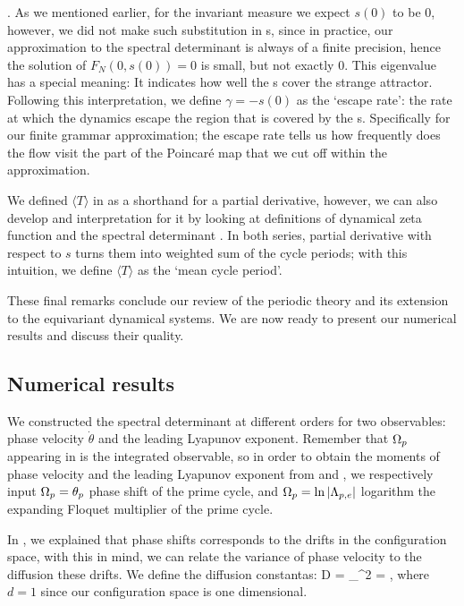                         \label{e-Avgsigma} .
\eea
As we mentioned earlier, for the invariant measure we expect $s (0)$ to be $0$,
however, we did not make such substitution in \cycForm s, since in practice,
our approximation to the spectral determinant is always of a finite precision,
hence the solution of $F_N(0, s(0)) = 0$ is small, but not exactly $0$. This
eigenvalue has a special meaning: It indicates how well the \po s cover the
strange attractor. Following this interpretation, we define $\gamma = - s(0)$
as the `escape rate': the rate at which the dynamics escape the region that is
covered by the \po s. Specifically for our finite grammar approximation; the
escape rate tells us how frequently does the flow visit the part of the
Poincar\'e map that we cut off within the approximation.

We defined $\langle T \rangle$ in  as a shorthand for a partial
derivative, however, we can also develop and interpretation for it by looking
at definitions of dynamical zeta function  and the
spectral determinant . In both series, partial
derivative with respect to $s$ turns them into weighted sum of the cycle
periods; with this intuition, we define $\langle T \rangle$ as the `mean cycle
period'.

These final remarks conclude our review of the periodic theory and its
extension to the equivariant dynamical systems. We are now ready to present
our numerical results and discuss their quality.

\subsection{Numerical results}
\label{s-NumResults}

We constructed the spectral determinant  at different
orders for two observables: phase velocity $\dot{\theta}$ and the leading
Lyapunov exponent. Remember that $\Omega_p$ appearing in
 is the integrated observable, so in order to
obtain the moments of phase velocity and the leading Lyapunov exponent from
 and , we respectively input
$\Omega_p = \theta_p$ phase shift of the prime cycle, and
$\Omega_p = \ln |\Lambda_{p,e}|$ logarithm the expanding Floquet multiplier of
the prime cycle.

In , we explained that  phase shifts corresponds to
the drifts in the configuration space, with this in mind, we can relate the
variance of phase velocity to the diffusion these drifts. We define the
diffusion constantas:
\beq
    D =  \sigma_{\dot{\theta}}^2
      =  ,
\eeq
where $d=1$ since our configuration space is one dimensional.

